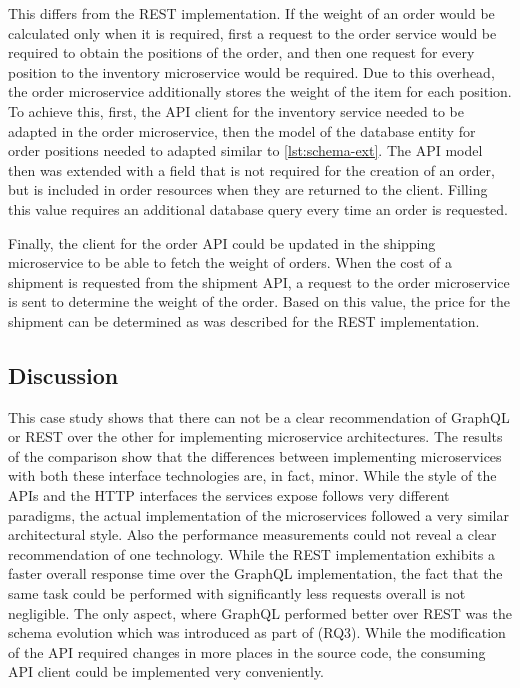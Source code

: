 This differs from the \ac{REST} implementation.
If the weight of an order would be calculated only when it is required, first a request to the order service would be required to obtain the positions of the order, and then one request for every position to the inventory microservice would be required.
Due to this overhead, the order microservice additionally stores the weight of the item for each position.
To achieve this, first, the \ac{API} client for the inventory service needed to be adapted in the order microservice, then the model of the database entity for order positions needed to adapted similar to \autoref{lst:schema-ext}.
The \ac{API} model then was extended with a field that is not required for the creation of an order, but is included in order resources when they are returned to the client.
Filling this value requires an additional database query every time an order is requested.

Finally, the client for the order \ac{API} could be updated in the shipping microservice to be able to fetch the weight of orders.
When the cost of a shipment is requested from the shipment \ac{API}, a request to the order microservice is sent to determine the weight of the order.
Based on this value, the price for the shipment can be determined as was described for the \ac{REST} implementation.

\subsection{Discussion}\label{sec:cs-disc}

This case study shows that there can not be a clear recommendation of GraphQL or \ac{REST} over the other for implementing microservice architectures.
The results of the comparison show that the differences between implementing microservices with both these interface technologies are, in fact, minor.
While the style of the \acp{API} and the \ac{HTTP} interfaces the services expose follows very different paradigms, the actual implementation of the microservices followed a very similar architectural style.
Also the performance measurements could not reveal a clear recommendation of one technology.
While the \ac{REST} implementation exhibits a faster overall response time over the GraphQL implementation, the fact that the same task could be performed with significantly less requests overall is not negligible.
The only aspect, where GraphQL performed better over \ac{REST} was the schema evolution which was introduced as part of (RQ3).
While the modification of the \ac{API} required changes in more places in the source code, the consuming \ac{API} client could be implemented very conveniently.


